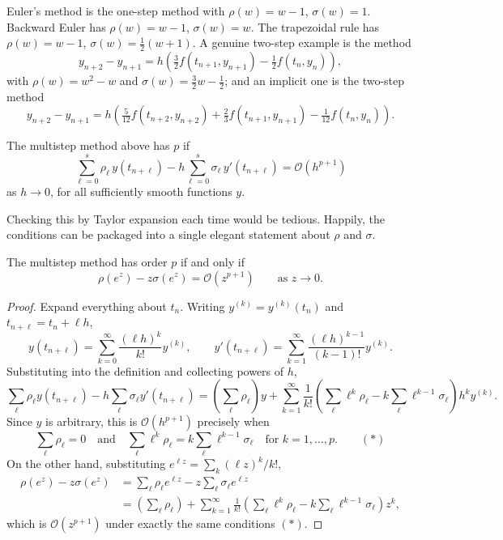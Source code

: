 \begin{example}
  Euler's method is the one-step method with $\rho(w) = w - 1$, $\sigma(w) = 1$. Backward Euler has $\rho(w) = w-1$, $\sigma(w) = w$. The trapezoidal rule has $\rho(w) = w - 1$, $\sigma(w) = \tfrac12(w+1)$. A genuine two-step example is the  method
  $$
  y_{n+2} - y_{n+1} = h\left(\tfrac32 f(t_{n+1},y_{n+1}) - \tfrac12 f(t_n, y_n)\right),
  $$
  with $\rho(w) = w^2 - w$ and $\sigma(w) = \tfrac32 w - \tfrac12$; and an implicit one is the two-step  method
  $$
  y_{n+2} - y_{n+1} = h\left(\tfrac{5}{12}f(t_{n+2},y_{n+2}) + \tfrac23 f(t_{n+1},y_{n+1}) - \tfrac1{12}f(t_n,y_n)\right).
  $$
\end{example}

\begin{definition}
  The multistep method above has  $p$ if
  $$
  \sum_{\ell=0}^s \rho_\ell\, y(t_{n+\ell}) - h\sum_{\ell=0}^s \sigma_\ell\, y'(t_{n+\ell}) = \mathcal{O}(h^{p+1})
  $$
  as $h \to 0$, for all sufficiently smooth functions $y$.
\end{definition}

Checking this by Taylor expansion each time would be tedious. Happily, the conditions can be packaged into a single elegant statement about $\rho$ and $\sigma$.

\begin{theorem}\label{thm:ordercond}
  The multistep method has order $p$ if and only if
  $$
  \rho(e^z) - z\sigma(e^z) = \mathcal{O}(z^{p+1}) \qquad \text{as } z \to 0.
  $$
\end{theorem}
\begin{proof}
  Expand everything about $t_n$. Writing $y^{(k)} = y^{(k)}(t_n)$ and $t_{n+\ell} = t_n + \ell h$,
  $$
  y(t_{n+\ell}) = \sum_{k=0}^\infty \frac{(\ell h)^k}{k!}y^{(k)}, \qquad y'(t_{n+\ell}) = \sum_{k=1}^\infty \frac{(\ell h)^{k-1}}{(k-1)!}y^{(k)} .
  $$
  Substituting into the definition and collecting powers of $h$,
  $$
  \sum_{\ell}\rho_\ell y(t_{n+\ell}) - h\sum_\ell \sigma_\ell y'(t_{n+\ell}) = \left(\sum_\ell \rho_\ell\right)y + \sum_{k=1}^\infty \frac{1}{k!}\left(\sum_\ell \ell^k \rho_\ell - k\sum_\ell \ell^{k-1}\sigma_\ell\right)h^k y^{(k)}.
  $$
  Since $y$ is arbitrary, this is $\mathcal{O}(h^{p+1})$ precisely when
  $$
  \sum_\ell \rho_\ell = 0 \quad\text{and}\quad \sum_\ell \ell^k \rho_\ell = k\sum_\ell \ell^{k-1}\sigma_\ell \quad \text{for } k = 1, \dots, p. \qquad (\ast)
  $$
  On the other hand, substituting $e^{\ell z} = \sum_k (\ell z)^k / k!$,
  \begin{align*}
  \rho(e^z) - z\sigma(e^z) &= \sum_\ell \rho_\ell e^{\ell z} - z\sum_\ell \sigma_\ell e^{\ell z}\\
  &= \left(\sum_\ell\rho_\ell\right) + \sum_{k=1}^\infty \frac{1}{k!}\left(\sum_\ell \ell^k\rho_\ell - k\sum_\ell \ell^{k-1}\sigma_\ell\right)z^k,
  \end{align*}
  which is $\mathcal{O}(z^{p+1})$ under exactly the same conditions $(\ast)$.
\end{proof}

